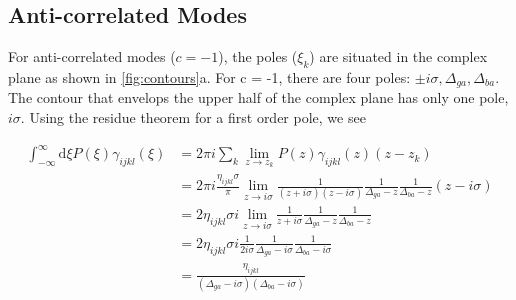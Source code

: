 \documentclass[aip, jcp, reprint, onecolumn, nofootinbib]{revtex4-2}
\begin{document}
\subsection{Anti-correlated Modes}
For anti-correlated modes ($c = -1$), the poles ($\xi_k$) are situated in the complex plane as shown in \autoref{fig:contours}a.
For c = -1, there are four poles: $\pm i \sigma, \Delta_{ga}, \Delta_{ba}$. 
The contour that envelops the upper half of the complex plane has only one pole, $i \sigma$.
Using the residue theorem for a first order pole,\cite{Carlson1990line} we see
\begin{widetext}
	\begin{equation}
		\begin{split}
			\int_{-\infty}^\infty \mathrm{d}\xi P(\xi) \gamma_{ijkl}(\xi) &= 2\pi i \sum_k \lim_{z \rightarrow z_k} P(z) \gamma_{ijkl}(z) (z - z_k)\\
			&= 2\pi i \frac{\eta_{ijkl} \sigma}{\pi} \lim_{z \rightarrow i\sigma} \frac{1}{(z + i\sigma)(z- i\sigma)} \frac{1}{\Delta_{ga} - z} \frac{1}{\Delta_{ba} - z} (z - i \sigma)\\
			&= 2 \eta_{ijkl} \sigma i \lim_{z \rightarrow i\sigma} \frac{1}{z + i\sigma} \frac{1}{\Delta_{ga} - z} \frac{1}{\Delta_{ba} - z}\\
			&= 2\eta_{ijkl} \sigma i \frac{1}{2i\sigma} \frac{1}{\Delta_{ga} - i\sigma} \frac{1}{\Delta_{ba} - i\sigma}\\
			&= \frac{\eta_{ijkl}}{\left(\Delta_{ga}-i\sigma\right)\left(\Delta_{ba}-i \sigma\right)}\\
		\end{split}
	\end{equation}
\end{widetext}
\end{document}
